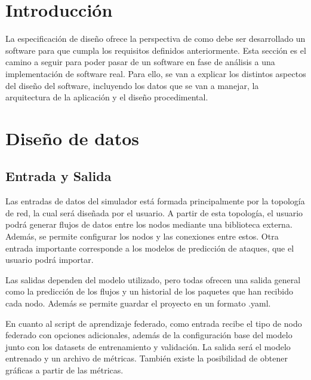 
\section{Introducción}
\label{sec:DisenoIntroduccion}
La especificación de diseño ofrece la perspectiva de como debe ser desarrollado un software para que cumpla los requisitos definidos anteriormente. Esta sección es el camino a seguir para poder pasar de un software en fase de análisis a una implementación de software real. Para ello, se van a explicar los distintos aspectos del diseño del software, incluyendo los datos que se van a manejar, la arquitectura de la aplicación y el diseño procedimental.

\section{Diseño de datos}
\label{sec:DisenoDatos}
\subsection{Entrada y Salida}
\label{subsec:DatosEntradaSalida}
Las entradas de datos del simulador está formada principalmente por la topología de red, la cual será diseñada por el usuario. A partir de esta topología, el usuario podrá generar flujos de datos entre los nodos mediante una biblioteca externa. Además, se permite configurar los nodos y las conexiones entre estos. Otra entrada importante corresponde a los modelos de predicción de ataques, que el usuario podrá importar.

Las salidas dependen del modelo utilizado, pero todas ofrecen una salida general como la predicción de los flujos y un historial de los paquetes que han recibido cada nodo. Además se permite guardar el proyecto en un formato .yaml.

En cuanto al script de aprendizaje federado, como entrada recibe el tipo de nodo federado con opciones adicionales, además de la configuración base del modelo junto con los datasets de entrenamiento y validación. La salida será el modelo entrenado y un archivo de métricas. También existe la posibilidad de obtener gráficas a partir de las métricas. 

